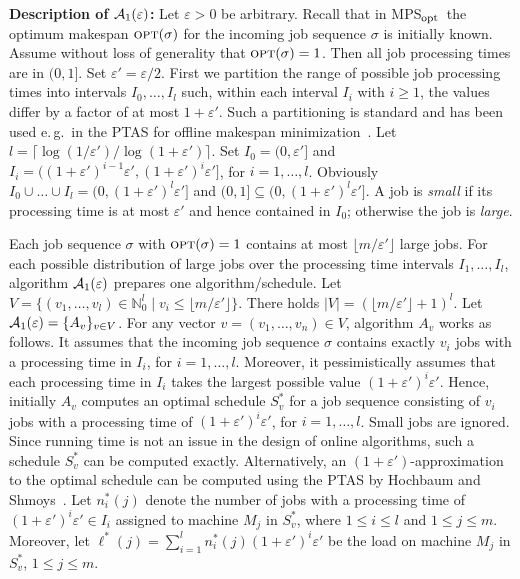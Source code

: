 \documentclass{llncs}
\newcommand{\OPT}{\text{{\sc opt}}}
\newcommand{\opt}{\OPT}
\newcommand{\MPSO}{{\rm MPS$_{\rm opt}$}}
\newcommand{\eps}{\varepsilon}
\begin{document}
{\bf Description of ${\cal A}_1(\eps)$:} Let $\eps>0$ be arbitrary. Recall that in \MPSO\ the optimum makespan
$\opt(\sigma)$ for the incoming job sequence $\sigma$ is initially known. Assume without loss of generality that
$\opt(\sigma)=1$. Then all job processing times are in $(0,1]$. Set $\eps' = \eps/2$. First we partition
the range of possible job processing times into intervals $I_0, \ldots, I_l$ such, within each interval $I_i$ 
with $i\geq 1$, the values differ by a factor of at most $1+\eps'$. Such a partitioning is 
standard and has been used e.\,g.\ in the PTAS for offline makespan minimization~\cite{HS}.
Let $l={\lceil \log(1/\eps') / \log(1+\eps') \rceil}$. Set $I_0 =(0,\eps']$ and 
$I_i = ((1+\eps')^{i-1}\eps', (1+\eps')^i\eps']$, for $i=1, \ldots, l$. Obviously 
$I_0\cup \ldots \cup I_l = (0, (1+\eps')^l\eps']$ and $(0,1] \subseteq (0, (1+\eps')^l\eps']$.
A job is {\em small\/} if its processing time is at most $\eps'$ and hence contained in $I_0$; otherwise the
job is {\em large\/}. 

Each job sequence $\sigma$ with $\opt(\sigma) = 1$ contains at most $\lfloor m/\eps'\rfloor$
large jobs. For each possible distribution of large jobs over the processing time intervals 
$I_1, \ldots, I_l$, algorithm ${\cal A}_1(\eps)$ prepares one algorithm/schedule.
Let $V=\{(v_1,\dots,v_l) \in \mathbb{N}^l_0 \mid  v_i \leq \lfloor m/\eps' \rfloor \}$. There holds 
$|V|=(\lfloor m/\eps'\rfloor+1)^l$. Let ${\cal A}_1(\eps) = \{A_v\}_{v\in V}$. For any vector 
$v=(v_1, \ldots, v_n)\in V$, algorithm $A_v$ works as follows. It assumes that the incoming job 
sequence $\sigma$ contains exactly $v_i$ jobs with a processing time in $I_i$, for $i=1, \ldots, l$. 
Moreover, it pessimistically assumes that each processing time in $I_i$ takes the largest possible
value $(1+\eps')^i\eps'$. Hence, initially $A_v$ computes an optimal schedule $S_v^*$ for a job 
sequence consisting of $v_i$ jobs with a processing time of $(1+\eps')^i\eps'$, for $i=1, \ldots, l$. Small
jobs are ignored. Since running time is not an issue in the design of online algorithms, such a
schedule $S_v^*$ can be computed exactly. Alternatively, an $(1+\eps')$-approximation to the
optimal schedule can be computed using the PTAS by Hochbaum and Shmoys~\cite{HS}.
Let $n_i^*(j)$ denote the number of jobs with a processing time of $(1+\eps')^i\eps'\in I_i$ assigned 
to machine $M_j$ in $S_v^*$, where $1\leq i \leq l$ and $1\leq j \leq m$. Moreover, let
$\ell^*(j) = \sum_{i=1}^l n_i^*(j) (1+\eps')^i\eps'$ be the load on machine $M_j$ in $S_v^*$, 
$1\leq j\leq m$. 
\end{document}

